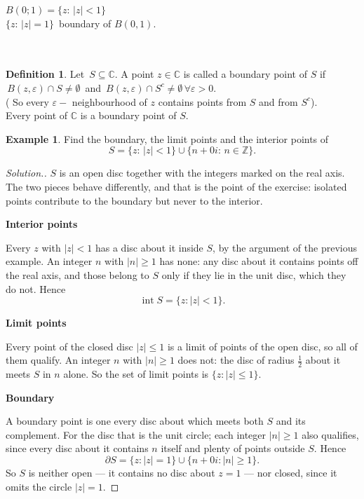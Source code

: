 \documentclass[11pt,a4paper]{article}
\theoremstyle{definition}
\newtheorem{definition}[thm]{Definition}
\newtheorem{example}[thm]{Example}
\newenvironment{solution}
  {\renewcommand{\qedsymbol}{}\begin{proof}[\textit{Solution}.]}
  {\end{proof}}
\newcommand{\subhead}[1]{%
  \par\medskip\noindent\textbf{#1}\par\nobreak\smallskip}
\begin{document}
$B(0;1) = \big\{z: \,\left|z\right| < 1\big\}$\\

$\big\{z: \, \left|z\right| = 1\big\}\,$ boundary of $B(0,1)$.\\\\\\














\begin{definition}
Let $\, S\subseteq \mathbb{C}$. A point $z \in \mathbb{C}$ is called a boundary point of $S$ if $\, B(z,\varepsilon) \cap S \neq \emptyset\,$ and $\, B(z,\varepsilon) \cap S^c \neq \emptyset\, \forall \varepsilon > 0$.\\

( So every $\varepsilon -$ neighbourhood of $z$ contains points from $S$ and from $S^c$).\\


Every point of $\mathbb{C}$ is a boundary point of $S$.
\end{definition}

\begin{example}
Find the boundary, the limit points and the interior points of
$$S = \big\{ z:\,\left|z\right| < 1\big\} \cup \big\{n + 0i: \, n\in \mathbb{Z}\big\}.$$
\end{example}
\begin{solution}
$S$ is an open disc together with the integers marked on the real axis. The two
pieces behave differently, and that is the point of the exercise: isolated
points contribute to the boundary but never to the interior.

\subhead{Interior points}
Every $z$ with $\left|z\right|<1$ has a disc about it inside $S$, by the
argument of the previous example. An integer $n$ with $\left|n\right|\geq 1$
has none: any disc about it contains points off the real axis, and those belong
to $S$ only if they lie in the unit disc, which they do not. Hence
$$\operatorname{int}S=\{z:\left|z\right|<1\}.$$

\subhead{Limit points}
Every point of the closed disc $\left|z\right|\leq 1$ is a limit of points of
the open disc, so all of them qualify. An integer $n$ with $\left|n\right|\geq
1$ does not: the disc of radius $\tfrac12$ about it meets $S$ in $n$ alone. So
the set of limit points is $\{z:\left|z\right|\leq 1\}$.

\subhead{Boundary}
A boundary point is one every disc about which meets both $S$ and its
complement. For the disc that is the unit circle; each integer
$\left|n\right|\geq 1$ also qualifies, since every disc about it contains $n$
itself and plenty of points outside $S$. Hence
$$\partial S=\{z:\left|z\right|=1\}\cup\{n+0i:\left|n\right|\geq 1\}.$$
So $S$ is neither open --- it contains no disc about $z=1$ --- nor closed, since
it omits the circle $\left|z\right|=1$.
\end{solution}
\end{document}
